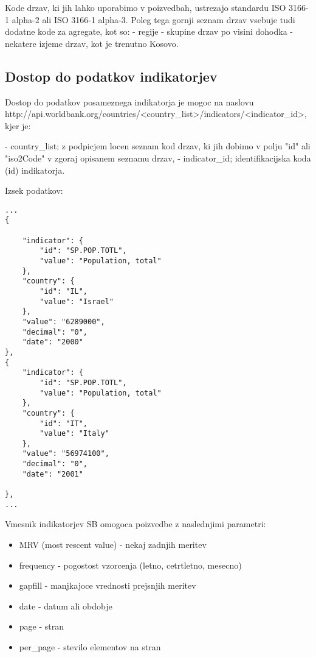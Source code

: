 Kode drzav, ki jih lahko uporabimo v poizvedbah, ustrezajo standardu ISO 
3166-1  
alpha-2 ali ISO 3166-1 alpha-3.
Poleg tega gornji seznam drzav vsebuje tudi dodatne kode za agregate, kot so:
- regije
- skupine drzav po visini dohodka
- nekatere izjeme drzav, kot je trenutno Kosovo.



\subsection{Dostop do podatkov indikatorjev}
Dostop do podatkov posameznega indikatorja je mogoc na naslovu
http://api.worldbank.org/countries/<country\_list>/indicators/<indicator\_id>,
kjer je:

- country\_list; z podpicjem locen seznam kod drzav, ki jih dobimo v polju "id"
ali "iso2Code" v zgoraj opisanem seznamu drzav,
- indicator\_id; identifikacijska koda (id) indikatorja.


Izsek podatkov:
\begin{lstlisting}
...
{

    "indicator": {
        "id": "SP.POP.TOTL",
        "value": "Population, total"
    },
    "country": {
        "id": "IL",
        "value": "Israel"
    },
    "value": "6289000",
    "decimal": "0",
    "date": "2000"
},
{
    "indicator": {
        "id": "SP.POP.TOTL",
        "value": "Population, total"
    },
    "country": {
        "id": "IT",
        "value": "Italy"
    },
    "value": "56974100",
    "decimal": "0",
    "date": "2001"

},
...
\end{lstlisting}


Vmesnik indikatorjev SB omogoca poizvedbe z naslednjimi parametri:

\begin{itemize}  
\item MRV (most rescent value) - nekaj zadnjih meritev
\item frequency - pogostost vzorcenja (letno, cetrtletno, mesecno)
\item gapfill - manjkajoce vrednosti prejsnjih meritev
\item date - datum ali obdobje
\item page - stran
\item per\_page - stevilo elementov na stran
\end{itemize}






